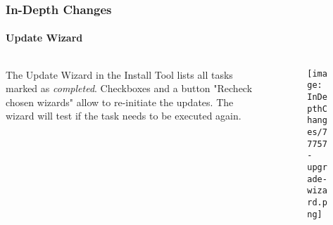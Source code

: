 \begin{frame}[fragile]
	\frametitle{In-Depth Changes}
	\framesubtitle{Update Wizard}

	\begin{columns}[T]
		\begin{column}{.5\textwidth}
			The Update Wizard in the Install Tool lists all tasks marked as \textit{completed}.
			\newline\newline
			Checkboxes and a button "Recheck chosen wizards" allow to re-initiate the updates.
			The wizard will test if the task needs to be executed again.
		\end{column}
		\begin{column}{.5\textwidth}
			\begin{figure}\vspace*{-0.5cm}
				\texttt{[image: InDepthChanges/77757-upgrade-wizard.png]}
			\end{figure}
		\end{column}
	\end{columns}

\end{frame}









